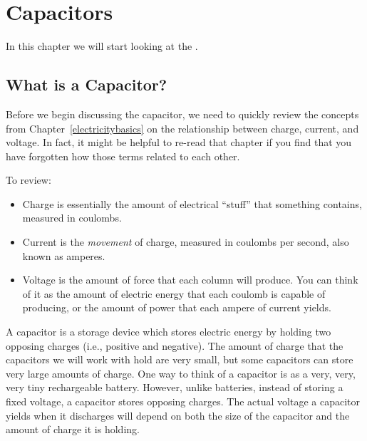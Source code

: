 \chapter{Capacitors}
\label{chapCapacitors}

%


In this chapter we will start looking at the . 

\section{What is a Capacitor?}

Before we begin discussing the capacitor, we need to quickly review the concepts from Chapter~\ref{electricitybasics} on the relationship between charge, current, and voltage.
In fact, it might be helpful to re-read that chapter if you find that you have forgotten how those terms related to each other.

To review:

\begin{itemize}
\item Charge is essentially the amount of electrical ``stuff'' that something contains, measured in coulombs.
\item Current is the \emph{movement} of charge, measured in coulombs per second, also known as amperes.
\item Voltage is the amount of force that each column will produce.  You can think of it as the amount of electric energy that each coulomb is capable of producing, or the amount of power that each ampere of current yields.  
\end{itemize}

A capacitor is a storage device which stores electric energy by holding two opposing charges (i.e., positive and negative).  
The amount of charge that the capacitors we will work with hold are very small, but some capacitors can store very large amounts of charge.
One way to think of a capacitor is as a very, very, very tiny rechargeable battery.
However, unlike batteries, instead of storing a fixed voltage, a capacitor stores opposing charges.
The actual voltage a capacitor yields when it discharges will depend on both the size of the capacitor and the amount of charge it is holding.

